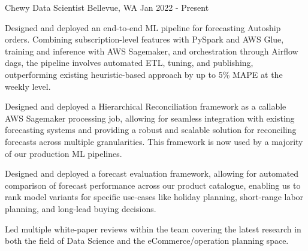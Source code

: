 \begin{cventries}
  \cveducationentry
    {Chewy} %
    {Data Scientist} %
    {Bellevue, WA} %
    {Jan 2022 - Present} %
    {
      \begin{cvitems}
        \item {Designed and deployed an end-to-end ML pipeline for forecasting Autoship orders. Combining subscription-level features with PySpark and AWS Glue, training and inference with AWS Sagemaker, and orchestration through Airflow dags, the pipeline involves automated ETL, tuning, and publishing, outperforming existing heuristic-based approach by up to 5\% MAPE at the weekly level.}
        \item {Designed and deployed a Hierarchical Reconciliation framework as a callable AWS Sagemaker processing job, allowing for seamless integration with existing forecasting systems and providing a robust and scalable solution for reconciling forecasts across multiple granularities. This framework is now used by a majority of our production ML pipelines.}        
        \item {Designed and deployed a forecast evaluation framework, allowing for automated comparison of forecast performance across our product catalogue, enabling us to rank model variants for specific use-cases like holiday planning, short-range labor planning, and long-lead buying decisions.}
        \item {Led multiple white-paper reviews within the team covering the latest research in both the field of Data Science and the eCommerce/operation planning space.}
      \end{cvitems}
    }


\end{cventries}
